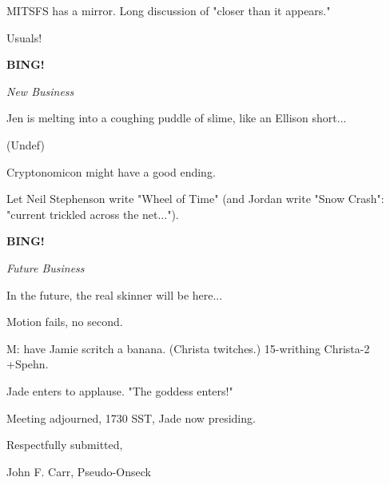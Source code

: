 \documentclass[12pt]{article}
\newcommand{\bing}{{\bf BING!} }
\newcommand{\goto}[1]{\bing \vskip 12pt \centerline{{\em{#1}}}}
\begin{document}
MITSFS has a mirror. Long discussion of "closer than it appears."

Usuals!

\goto{New Business}

Jen is melting into a coughing puddle of slime, like an Ellison short...

(Undef)

Cryptonomicon might have a good ending.

Let Neil Stephenson write "Wheel of Time" (and Jordan write "Snow Crash": "current trickled across the net...").

\goto{Future Business}

In the future, the real skinner will be here...

Motion fails, no second.

M: have Jamie scritch a banana. (Christa twitches.) 15-writhing Christa-2 +Spehn.

Jade enters to applause. "The goddess enters!"

\vspace{12pt}

\noindent
Meeting adjourned, 1730 SST, Jade now presiding.

\vspace{18pt}

\centerline{Respectfully submitted,}
\centerline{John F. Carr, Pseudo-Onseck}
\end{document}
